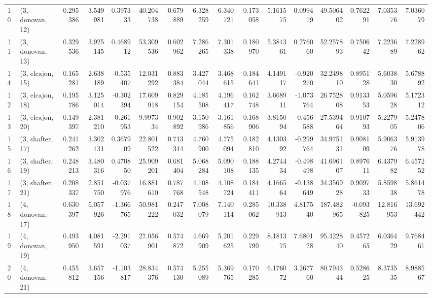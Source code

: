 \begin{tabular}{llrrrrrrrrrrrrrr}
10 &  (3, donovan, 12) &   0.295386 &  3.549981 &  0.397333 &  40.204738 &  0.679889 &   6.328259 &  6.340721 &  0.173058 &   5.161575 &  0.099419 &   49.506402 &  0.762291 &   7.035376 &   7.036079 \\
11 &  (3, donovan, 13) &   0.329536 &  3.925145 &  0.468912 &  53.309536 &  0.602962 &   7.286265 &  7.301338 &  0.180970 &   5.384361 &  0.276060 &   52.257893 &  0.750642 &   7.223689 &   7.228962 \\
14 &  (3, elcajon, 15) &   0.165281 &  2.638189 & -0.535407 &  12.031292 &  0.883384 &   3.427044 &  3.468615 &  0.184641 &   4.149117 & -0.920270 &   32.249810 &  0.895128 &   5.603830 &   5.678892 \\
12 &  (3, elcajon, 18) &   0.195786 &  3.125014 & -0.302394 &  17.609918 &  0.829154 &   4.185508 &  4.196417 &  0.162748 &   3.668911 & -1.073764 &   26.752808 &  0.913353 &   5.059628 &   5.172312 \\
13 &  (3, elcajon, 20) &   0.149397 &  2.381210 & -0.261953 &   9.997334 &  0.902892 &   3.150986 &  3.161856 &  0.168906 &   3.815094 & -0.456588 &   27.539464 &  0.910793 &   5.227905 &   5.247806 \\
15 &  (3, shafter, 17) &   0.241262 &  3.302431 &  0.367909 &  22.801522 &  0.713344 &   4.760900 &  4.775094 &  0.182810 &   4.130392 & -0.299764 &   34.975131 &  0.908109 &   5.906376 &   5.913978 \\
16 &  (3, shafter, 19) &   0.248213 &  3.480316 &  0.470850 &  25.909201 &  0.681404 &   5.068284 &  5.090108 &  0.188135 &   4.274434 & -0.498498 &   41.696107 &  0.897611 &   6.437982 &   6.457252 \\
17 &  (3, shafter, 21) &   0.208337 &  2.851750 & -0.037976 &  16.881610 &  0.787768 &   4.108548 &  4.108724 &  0.184411 &   4.166564 & -0.138649 &   34.356928 &  0.909733 &   5.859838 &   5.861478 \\
18 &  (4, donovan, 17) &   0.630397 &  5.057926 & -1.366765 &  50.981222 &  0.247032 &   7.008079 &  7.140114 &  0.285062 &  10.338913 &  4.817540 &  187.482965 & -0.093825 &  12.816953 &  13.692442 \\
19 &  (4, donovan, 19) &   0.493950 &  4.081591 & -2.291037 &  27.056901 &  0.574872 &   4.669909 &  5.201625 &  0.229799 &   8.181375 &  7.680128 &   95.422840 &  0.457265 &   6.036429 &   9.768461 \\
20 &  (4, donovan, 21) &   0.455812 &  3.657156 & -1.103817 &  28.834376 &  0.574130 &   5.255089 &  5.369765 &  0.170285 &   6.176072 &  3.267760 &   80.794344 &  0.528625 &   8.373535 &   8.988567 \\

\end{tabular}
